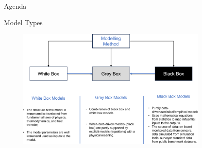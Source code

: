 \documentclass[aspectratio=169,hyperref={pdfpagelabels=false}]{beamer}
\subtitle{\normalsize{Industrial IoT for Digitization of Electronis Assets}}
\title{}
\begin{document}
\inserttitlepage

\begin{frame}{Agenda}
  \tableofcontents
\end{frame}

\begin{frame}{Model Types}
  \begin{figure}[t]
    \centering
    \includegraphics[width=0.85\textwidth]{img/modelling_methods.pdf}
\end{figure}
\end{frame}
\end{document}
